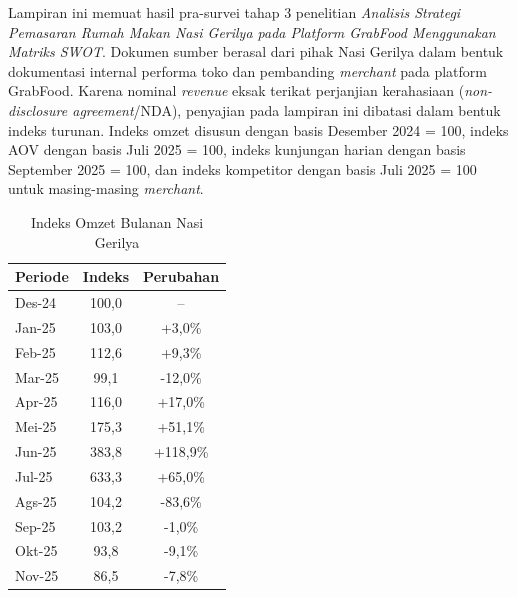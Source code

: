 \label{app:prasurvey3}

Lampiran ini memuat hasil pra-survei tahap 3 penelitian \textit{Analisis Strategi Pemasaran Rumah Makan Nasi Gerilya pada Platform GrabFood Menggunakan Matriks SWOT}. Dokumen sumber berasal dari pihak Nasi Gerilya dalam bentuk dokumentasi internal performa toko dan pembanding \textit{merchant} pada platform GrabFood. Karena nominal \textit{revenue} eksak terikat perjanjian kerahasiaan (\textit{non-disclosure agreement}/NDA), penyajian pada lampiran ini dibatasi dalam bentuk indeks turunan. Indeks omzet disusun dengan basis Desember 2024 = 100, indeks AOV dengan basis Juli 2025 = 100, indeks kunjungan harian dengan basis September 2025 = 100, dan indeks kompetitor dengan basis Juli 2025 = 100 untuk masing-masing \textit{merchant}.

\begin{table}[h!]
    \centering
    \caption{Indeks Omzet Bulanan Nasi Gerilya}
    \label{tab:prasurvey3_indeks_omzet}
    \begin{tabular}{lcc}
        \toprule
        \textbf{Periode} & \textbf{Indeks} & \textbf{Perubahan} \\
        \midrule
        Des-24           & 100,0           & --                 \\
        Jan-25           & 103,0           & +3,0\%             \\
        Feb-25           & 112,6           & +9,3\%             \\
        Mar-25           & 99,1            & -12,0\%            \\
        Apr-25           & 116,0           & +17,0\%            \\
        Mei-25           & 175,3           & +51,1\%            \\
        Jun-25           & 383,8           & +118,9\%           \\
        Jul-25           & 633,3           & +65,0\%            \\
        Ags-25           & 104,2           & -83,6\%            \\
        Sep-25           & 103,2           & -1,0\%             \\
        Okt-25           & 93,8            & -9,1\%             \\
        Nov-25           & 86,5            & -7,8\%             \\
        \bottomrule
    \end{tabular}
\end{table}

